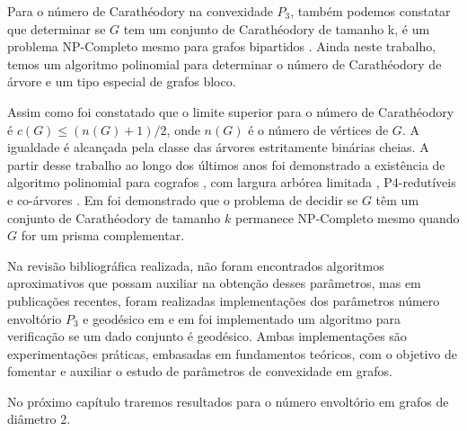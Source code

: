 Para o número de Carathéodory na convexidade $P_3$, 
também podemos constatar que determinar se $G$ tem um conjunto de Carathéodory de tamanho k, é um problema NP-Completo mesmo para grafos bipartidos \cite{Barbosa2012}. 
Ainda neste trabalho, temos um algoritmo polinomial para determinar o número de Carathéodory de árvore e um tipo especial de grafos bloco. 

Assim como foi constatado que o limite superior para o número de Carathéodory é $c(G) \le (n(G) + 1)/2$, onde $n(G)$ é o número de vértices de $G$. A igualdade é alcançada pela classe das árvores estritamente binárias cheias. A partir desse trabalho ao longo dos últimos anos foi demonstrado a existência de algoritmo polinomial para cografos \cite{Coelho2014}, com largura arbórea limitada \cite{Hon2016}, P4-redutíveis \cite{Hon2016} e co-árvores \cite{Hon2016}. Em \cite{Duarte} foi demonstrado que o problema
de decidir se $G$ têm um conjunto de Carathéodory de tamanho $k$ permanece NP-Completo mesmo quando $G$ for um prisma complementar.


Na revisão bibliográfica realizada, 
não foram encontrados algoritmos aproximativos que possam auxiliar na obtenção desses parâmetros, mas  em publicações recentes, foram realizadas implementações dos parâmetros 
número envoltório $P_3$ e geodésico em \cite{Lacerda2017} e em \cite{Leonardo2016} foi implementado um algoritmo para verificação se um dado conjunto é geodésico.
Ambas implementações são experimentações práticas, embasadas em fundamentos teóricos, 
com o objetivo de fomentar e auxiliar o estudo de parâmetros de convexidade em grafos.

No próximo capítulo traremos resultados para o número envoltório em grafos de diâmetro 2.



